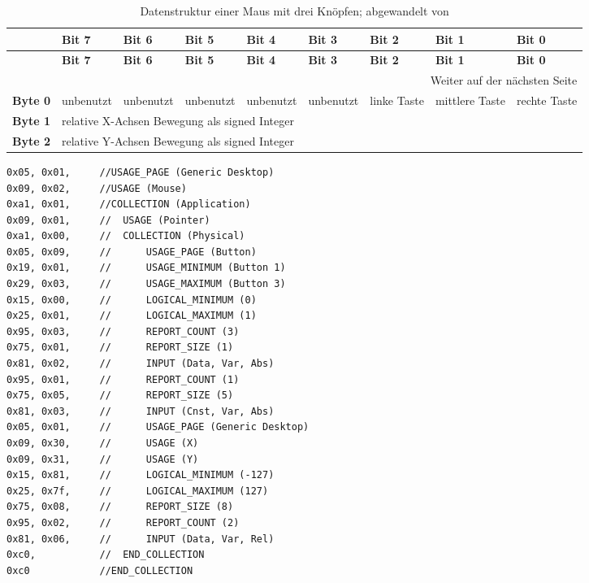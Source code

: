 \begin{small}
    \begin{longtable}[c]{|p{1.5cm}|p{1.5cm}|p{1.5cm}|p{1.5cm}|p{1.5cm}|p{1.5cm}|p{1cm}|p{1cm}|p{1cm}|}
        \caption{Datenstruktur einer Maus mit drei Knöpfen; abgewandelt von \cite{usbHIDTutorial}}
        \label{table:mousedatastructure}\\
        \hline
        & \textbf{Bit 7} & \textbf{Bit 6} & \textbf{Bit 5} & \textbf{Bit 4} & \textbf{Bit 3} & \textbf{Bit 2} & \textbf{Bit 1} & \textbf{Bit 0} \\
        \hline
        \hline
        \endfirsthead

        \hline
        & \textbf{Bit 7} & \textbf{Bit 6} & \textbf{Bit 5} & \textbf{Bit 4} & \textbf{Bit 3} & \textbf{Bit 2} & \textbf{Bit 1} & \textbf{Bit 0} \\
        \hline
        \hline
        \endhead

        \hline
        \multicolumn{9}{|r|}{Weiter auf der nächsten Seite}\\
        \hline
        \endfoot

        \hline
        \endlastfoot
        
        \textbf{Byte 0} & unbenutzt & unbenutzt & unbenutzt & unbenutzt & unbenutzt & linke Taste & mittlere Taste & rechte Taste \\
        \hline
        \textbf{Byte 1} & \multicolumn{8}{l|}{relative X-Achsen Bewegung als signed Integer} \\
        \hline
        \textbf{Byte 2} & \multicolumn{8}{l|}{relative Y-Achsen Bewegung als signed Integer} \\
    \end{longtable}
\end{small}

\begin{lstlisting}[caption=Report Deskriptor einer Maus mit 3 Knöpfen \cite{usbHIDTutorial}, label={lst:reportDeskriptor}, style=generalStyle]
0x05, 0x01,     //USAGE_PAGE (Generic Desktop)
0x09, 0x02,     //USAGE (Mouse)
0xa1, 0x01,     //COLLECTION (Application)
0x09, 0x01,     //  USAGE (Pointer)
0xa1, 0x00,     //  COLLECTION (Physical)
0x05, 0x09,     //      USAGE_PAGE (Button)
0x19, 0x01,     //      USAGE_MINIMUM (Button 1)
0x29, 0x03,     //      USAGE_MAXIMUM (Button 3)
0x15, 0x00,     //      LOGICAL_MINIMUM (0)
0x25, 0x01,     //      LOGICAL_MAXIMUM (1)
0x95, 0x03,     //      REPORT_COUNT (3)
0x75, 0x01,     //      REPORT_SIZE (1)
0x81, 0x02,     //      INPUT (Data, Var, Abs)
0x95, 0x01,     //      REPORT_COUNT (1)
0x75, 0x05,     //      REPORT_SIZE (5)
0x81, 0x03,     //      INPUT (Cnst, Var, Abs)
0x05, 0x01,     //      USAGE_PAGE (Generic Desktop)
0x09, 0x30,     //      USAGE (X)
0x09, 0x31,     //      USAGE (Y)
0x15, 0x81,     //      LOGICAL_MINIMUM (-127)
0x25, 0x7f,     //      LOGICAL_MAXIMUM (127)
0x75, 0x08,     //      REPORT_SIZE (8)
0x95, 0x02,     //      REPORT_COUNT (2)
0x81, 0x06,     //      INPUT (Data, Var, Rel)
0xc0,           //  END_COLLECTION
0xc0            //END_COLLECTION
\end{lstlisting}


